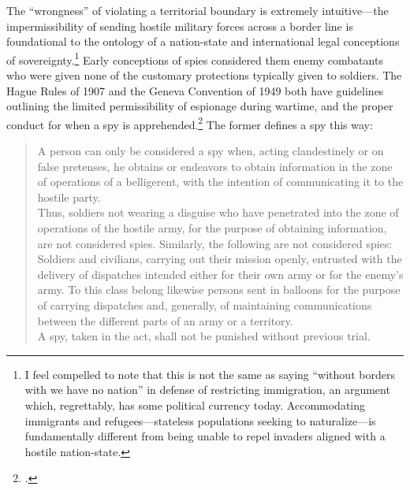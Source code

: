 \documentclass[11pt]{memoir}
\begin{document}
\begin{refsegment}
The ``wrongness'' of violating a territorial boundary is extremely intuitive---the impermissibility of sending hostile military forces across a border line is foundational to the ontology of a nation-state and international legal conceptions of sovereignty.\footnote{I feel compelled to note that this is not the same as saying ``without borders with we have no nation'' in defense of restricting immigration, an argument which, regrettably, has some political currency today. Accommodating immigrants and refugees---stateless populations seeking to naturalize---is fundamentally different from being unable to repel invaders aligned with a hostile nation-state.} Early conceptions of spies considered them enemy combatants who were given none of the customary protections typically given to soldiers. The Hague Rules of 1907 and the Geneva Convention of 1949 both have guidelines outlining the limited permissibility of espionage during wartime, and the proper conduct for when a spy is apprehended.\footcite[p.~652]{beim_enforcing_2018} The former defines a spy this way:

\begin{quote}
A person can only be considered a spy when, acting clandestinely or on false pretenses, he obtains or endeavors to obtain information in the zone of operations of a belligerent, with the intention of communicating it to the hostile party. \\

Thus, soldiers not wearing a disguise who have penetrated into the zone of operations of the hostile army, for the purpose of obtaining information, are not considered spies. Similarly, the following are not considered spies: Soldiers and civilians, carrying out their mission openly, entrusted with the delivery of dispatches intended either for their own army or for the enemy's army. To this class belong likewise persons sent in balloons for the purpose of carrying dispatches and, generally, of maintaining communications between the different parts of an army or a territory. \\

A spy, taken in the act, shall not be punished without previous trial. \\


\end{quote}
\end{refsegment}
\end{document}
